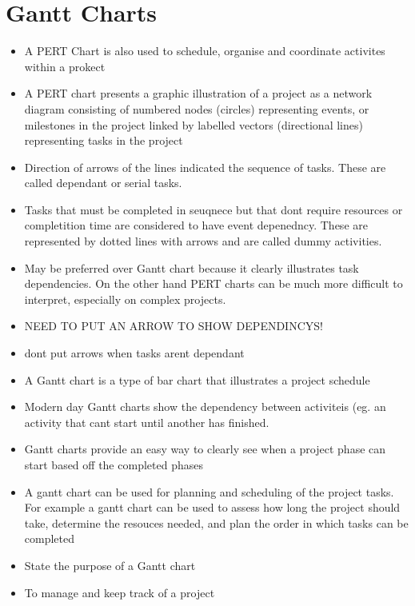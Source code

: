 \documentclass[12pt, a4, twoside]{article}
\begin{document}
  \section{Gantt Charts}
  \begin{itemize}
    \item A PERT Chart is also used to schedule, organise and coordinate activites within a prokect
    \item A PERT chart presents a graphic illustration of a project as a network diagram consisting of numbered nodes (circles) representing events, or milestones in the project linked by labelled vectors (directional lines) representing tasks in the project
    \item Direction of arrows of the lines indicated the sequence of tasks. These are called dependant or serial tasks.
    \item Tasks that must be completed in seuqnece but that dont require resources or completition time are considered to have event depenedncy. These are represented by dotted lines with arrows and are called dummy activities.
    \item May be preferred over Gantt chart because it clearly illustrates task dependencies. On the other hand PERT charts can be much more difficult to interpret, especially on complex projects.
    \item NEED TO PUT AN ARROW TO SHOW DEPENDINCYS!
    \item dont put arrows when tasks arent dependant
    \item A Gantt chart is a type of bar chart that illustrates a project schedule
    \item Modern day Gantt charts show the dependency between activiteis (eg. an activity that cant start until another has finished.
    \item Gantt charts provide an easy way to clearly see when a project phase can start based off the completed phases
    \item A gantt chart can be used for planning and scheduling of the project tasks. For example a gantt chart can be used to assess how long the project should take, determine the resouces needed, and plan the order in which tasks can be completed 
    \item State the purpose of a Gantt chart 
    \item To manage and keep track of a project 
  \end{itemize}
\end{document}
